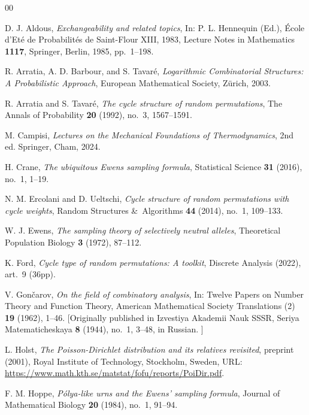 \documentclass{amsart}
\theoremstyle{definition}
\theoremstyle{remark}
\numberwithin{equation}{section}
\begin{document}
\begin{thebibliography}{00}

D. J. Aldous,
\textit{Exchangeability and related topics},
In: P. L. Hennequin (Ed.), \'{E}cole d'Et\'{e} de Probabilit\'{e}s de Saint-Flour XIII, 1983, Lecture Notes in Mathematics \textbf{1117},
Springer, Berlin, 1985, pp.~1--198.

R. Arratia, A. D. Barbour, and S. Tavar\'{e},
\textit{Logarithmic Combinatorial Structures: A Probabilistic Approach},
European Mathematical Society, Z\"{u}rich, 2003. 

R. Arratia and S. Tavar{\'e},
\textit{The cycle structure of random permutations},
{The Annals of Probability} \textbf{20} (1992), no.~3, 1567--1591.

M. Campisi,
\textit{Lectures on the Mechanical Foundations of Thermodynamics}, 2nd ed.
Springer, Cham, 2024.

H. Crane, 
\textit{The ubiquitous Ewens sampling formula},
{Statistical Science} \textbf{31} (2016), no.~1, 1--19.

N. M. Ercolani and D. Ueltschi,
\textit{Cycle structure of random permutations with cycle weights},
{Random Structures \&\ Algorithms} \textbf{44} (2014), no.~1, 109--133.

W. J. Ewens,
\textit{The sampling theory of selectively neutral alleles},
{Theoretical Population Biology} \textbf{3} (1972), 87--112.

K. Ford,
\textit{Cycle type of random permutations: A toolkit},
{Discrete Analysis} (2022), art.~9 (36pp). 

V. Gon\v{c}arov, 
\textit{On the field of combinatory analysis},
In: Twelve Papers on Number Theory and Function Theory,
{American Mathematical Society Translations (2)} \textbf{19} (1962), 1--46. 
[Originally published in {Izvestiya Akademii Nauk SSSR, Seriya Matematicheskaya} \textbf{8} (1944), no.~1, 3--48, in Russian. ]
    
L. Holst, 
\textit{The Poisson-Dirichlet distribution and its relatives revisited},
preprint (2001), Royal Institute of Technology, Stockholm, Sweden, URL: \url{https://www.math.kth.se/matstat/fofu/reports/PoiDir.pdf}.

F. M. Hoppe,
\textit{P{\'o}lya-like urns and the {E}wens' sampling formula},
{Journal of Mathematical Biology} \textbf{20} (1984), no.~1, 91--94.


\end{thebibliography}
\end{document}
